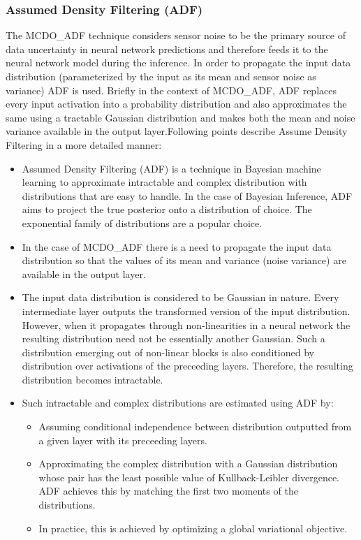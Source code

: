 	\subsubsection{Assumed Density Filtering (ADF)}\label{sec_adf}
	The MCDO\_ADF technique considers sensor noise to be the primary source of data uncertainty in neural network predictions and therefore feeds it to the neural network model during the inference. In order to propagate the input data distribution (parameterized by the input as its mean and sensor noise as variance) ADF is used. Briefly in the context of MCDO\_ADF, ADF replaces every input activation into a probability distribution and also approximates the same using a tractable Gaussian distribution and makes both the mean and noise variance available in the output layer.Following points describe Assume Density Filtering in a more detailed manner:
	\begin{itemize}
		\item Assumed Density Filtering (ADF) is a technique in Bayesian machine learning to approximate intractable and complex distribution with distributions that are easy to handle. In the case of Bayesian Inference, ADF aims to project the true posterior onto a distribution of choice. The exponential family of distributions are a popular choice.
		\item In the case of MCDO\_ADF there is a need to propagate the input data distribution so that the values of its mean and variance (noise variance) are available in the output layer. 
		\item The input data distribution is considered to be Gaussian in nature. Every intermediate layer outputs the transformed version of the input distribution.  However, when it propagates through non-linearities in a neural network the resulting distribution need not be essentially another Gaussian. Such a distribution emerging out of non-linear blocks is also conditioned by distribution over activations of the preceeding layers. Therefore, the resulting distribution becomes intractable.
		\item Such intractable and complex distributions are estimated using ADF by:
		\begin{itemize}
			\item Assuming conditional independence between distribution outputted from a given layer with its preceeding layers. 
			\item Approximating the complex distribution with a Gaussian distribution whose pair has the least possible value of Kullback-Leibler divergence. ADF achieves this by matching the first two moments of the distributions.
			\item In practice, this is achieved by optimizing a global variational objective.
		\end{itemize} 
	\end{itemize}
